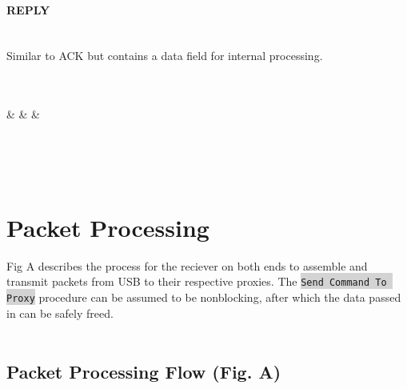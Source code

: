 \documentclass[pstricks,border=12pt,10pt]{article}
\begin{document}
	\paragraph{REPLY} \mbox{}\\
	Similar to ACK but contains a data field for internal processing.  \\
	\\
	\begin{bytefield}[bitwidth=1.1em]{32}
		 \\
		 &
		 &
		 &
		 \\
		\\
		 \\
	\end{bytefield}\\
	\section{Packet Processing}
	Fig A describes the process for the reciever on both ends to assemble and transmit packets from USB to their respective proxies. The \colorbox{lightgray}{\lstinline{Send Command To Proxy}} procedure can be assumed to be nonblocking, after which the data passed in can be safely freed. \\
	\\	
	\subsection{Packet Processing Flow (Fig. A)}
	\label{Fig. A}
	\scalebox{0.6}{}
	
\end{document}
